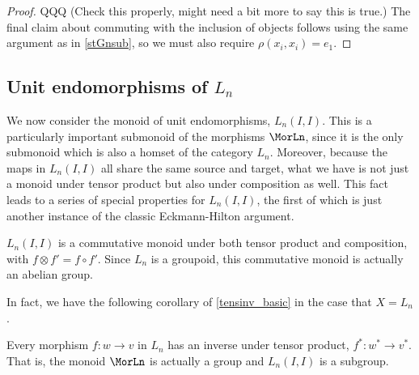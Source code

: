 \begin{proof}
QQQ (Check this properly, might need a bit more to say this is true.) The final claim about commuting with the inclusion of objects follows using the same argument as in  \cref{stGnsub}, so we must also require $\rho(x_i, x_i) = e_1$.

\end{proof} 

\subsection{Unit endomorphisms of \texorpdfstring{$L_n$}{L_n}}

We now consider the monoid of unit endomorphisms, $L_n(I,I)$. This is a particularly important submonoid of the morphisms $\MorLn$, since it is the only submonoid which is also a homset of the category $L_n$. Moreover, because the maps in $L_n(I,I)$ all share the same source and target, what we have is not just a monoid under tensor product but also under composition as well. This fact leads to a series of special properties for $L_n(I,I)$, the first of which is just another instance of the classic Eckmann-Hilton argument. 

\begin{prop} \label{endcom} $L_n(I,I)$ is a commutative monoid under both tensor product and composition, with $f \otimes f' = f \circ f'$. Since $L_n$ is a groupoid, this commutative monoid is actually an abelian group.
\end{prop}

In fact, we have the following corollary of \cref{tensinv_basic} in the case that $X = L_n$.

\begin{cor} \label{tensinv} Every morphism $f \colon  w \rightarrow v$ in $L_n$ has an inverse under tensor product, $f^* \colon  w^* \rightarrow v^*$. That is, the monoid $\MorLn$ is actually a group and $L_n(I,I)$ is a subgroup.
\end{cor}



